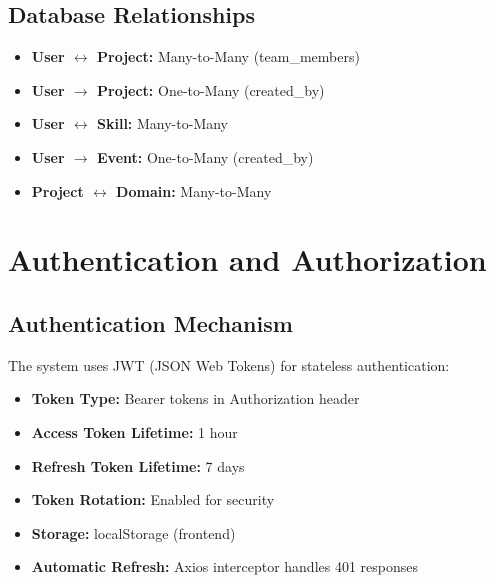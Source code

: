 \documentclass[11pt,a4paper]{article}
\begin{document}
\subsection{Database Relationships}
\begin{itemize}[leftmargin=*]
    \item \textbf{User $\leftrightarrow$ Project:} Many-to-Many (team\_members)
    \item \textbf{User $\rightarrow$ Project:} One-to-Many (created\_by)
    \item \textbf{User $\leftrightarrow$ Skill:} Many-to-Many
    \item \textbf{User $\rightarrow$ Event:} One-to-Many (created\_by)
    \item \textbf{Project $\leftrightarrow$ Domain:} Many-to-Many
\end{itemize}

\section{Authentication and Authorization}

\subsection{Authentication Mechanism}
The system uses JWT (JSON Web Tokens) for stateless authentication:

\begin{itemize}[leftmargin=*]
    \item \textbf{Token Type:} Bearer tokens in Authorization header
    \item \textbf{Access Token Lifetime:} 1 hour
    \item \textbf{Refresh Token Lifetime:} 7 days
    \item \textbf{Token Rotation:} Enabled for security
    \item \textbf{Storage:} localStorage (frontend)
    \item \textbf{Automatic Refresh:} Axios interceptor handles 401 responses
\end{itemize}
\end{document}
